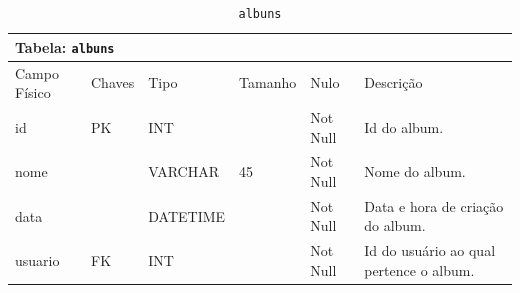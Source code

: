 \documentclass[12pt,a4paper]{article}
\begin{document}
\begin{center}
\begin{table}[h!]
	\caption{\texttt{albuns}}
	\label{tabela:albuns}
	\begin{tabular}{|p{2.3cm}|p{1.2cm}|p{1.8cm}|p{1.5cm}|p{1cm}|p{6cm}|}\hline	
		\multicolumn{6}{|p{16cm}|}{\cellcolor{cinzaClaro}  \centering Tabela: \texttt{albuns}} \\ \hline %
		{\small Campo Físico}   & {\small Chaves} & {\small Tipo} & {\small Tamanho} & {\small Nulo} & {\small Descrição}\\\hline %
		
		{\tiny id} & {\tiny PK} & {\tiny INT} & {\tiny } & {\tiny Not Null} &{\tiny Id do album.}\\\hline
		{\tiny nome} & {\tiny } & {\tiny VARCHAR} & {\tiny 45} & {\tiny Not Null} &{\tiny Nome do album.}\\\hline
		{\tiny data} & {\tiny } & {\tiny DATETIME} & {\tiny } & {\tiny Not Null} &{\tiny Data e hora de criação do album.}\\\hline
		{\tiny usuario} & {\tiny FK} & {\tiny INT} & {\tiny } & {\tiny Not Null} &{\tiny Id do usuário ao qual pertence o album.}\\\hline
			
	\end{tabular}
\end{table}	
\end{center}
\end{document}
